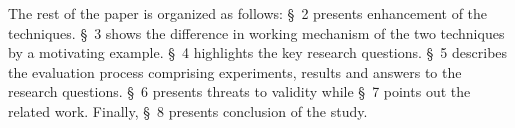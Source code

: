 \documentclass[runningheads,a4paper]{llncs}
\begin{document}
The rest of the paper is organized as follows: \S~2 presents enhancement of the techniques. \S~3 shows the difference in working mechanism of the two techniques by a motivating example. \S~4 highlights the key research questions. \S~5 describes the evaluation process comprising experiments, results and answers to the research questions. \S~6 presents threats to validity while \S~7 points out the related work. Finally, \S~8 presents conclusion of the study.


 




\end{document}
